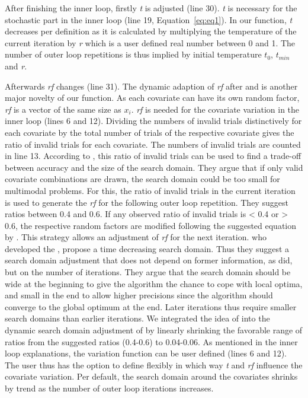 After finishing the inner loop, firstly \textit{t} is adjusted (line 30). \textit{t} is necessary for the stochastic part in the inner loop (line 19, Equation~\eqref{eq:eq1}). In our function, \textit{t} decreases per definition as it is calculated by multiplying the temperature of the current iteration by \textit{r} which is a user defined real number between 0 and 1. The number of outer loop repetitions is thus implied by initial temperature $t_0$, $t_{min}$ and \textit{r}.

Afterwards \textit{rf} changes (line 31). The dynamic adaption of \textit{rf} after \citet{corana_1987} and \citet{pronzato_1984} is another major novelty of our function. As each covariate can have its own random factor, \textit{rf} is a vector of the same size as $x_i$. \textit{rf} is needed for the covariate variation in the inner loop (lines 6 and 12). Dividing the numbers of invalid trials distinctively for each covariate by the total number of trials of the respective covariate gives the ratio of invalid trials for each covariate. The numbers of invalid trials are counted in line 13. According to \citep{corana_1987}, this ratio of invalid trials can be used to find a trade-off between accuracy and the size of the search domain. They argue that if only valid covariate combinations are drawn, the search domain could be too small for multimodal problems. For this, the ratio of invalid trials in the current iteration is used to generate the \textit{rf} for the following outer loop repetition. They suggest ratios between 0.4 and 0.6. If any observed ratio of invalid trials is < 0.4 or > 0.6, the respective random factors are modified following the suggested equation by \citet{corana_1987}. This strategy allows an adjustment of \textit{rf} for the next iteration. \citet{pronzato_1984} who developed the , propose a time decreasing search domain. Thus they suggest a search domain adjustment that does not depend on former information, as \citet{corana_1987} did, but on the number of iterations. They argue that the search domain should be wide at the beginning to give the algorithm the chance to cope with local optima, and small in the end to allow higher precisions since the algorithm should converge to the global optimum at the end. Later iterations thus require smaller search domains than earlier iterations. We integrated the idea of \citet{pronzato_1984} into the dynamic search domain adjustment of \citep{corana_1987} by linearly shrinking the favorable range of ratios from the suggested ratios (0.4-0.6) to 0.04-0.06. As mentioned in the inner loop explanations, the variation function can be user defined (lines 6 and 12). The user thus has the option to define flexibly in which way \textit{t} and \textit{rf} influence the covariate variation. Per default, the search domain around the covariates shrinks by trend as the number of outer loop iterations increases.

